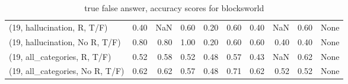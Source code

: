 \begin{table*}[h!]
\begin{adjustbox}{width=2\columnwidth,center}
\begin{tabular}{lrrr|rrr|rrr}
(19, hallucination, R, T/F)           &                      0.40 &                   NaN &                      0.60 &                          0.20 &                      0.60 &                          0.40 &                                    NaN &                               0.60 &                                  None \\
(19, hallucination, No R, T/F)        &                      0.80 &                  0.80 &                      1.00 &                          0.20 &                      0.60 &                          0.60 &                                   0.40 &                               0.40 &                                  None \\
(19, all\_categories, R, T/F)          &                      0.52 &                  0.58 &                      0.52 &                          0.48 &                      0.57 &                          0.43 &                                    NaN &                               0.62 &                                  None \\
(19, all\_categories, No R, T/F)       &                      0.62 &                  0.62 &                      0.57 &                          0.48 &                      0.71 &                          0.62 &                                   0.52 &                               0.52 &                                  None \\


\bottomrule
\end{tabular}
\end{adjustbox}
\caption{true false answer, accuracy scores for blocksworld}
\end{table*}